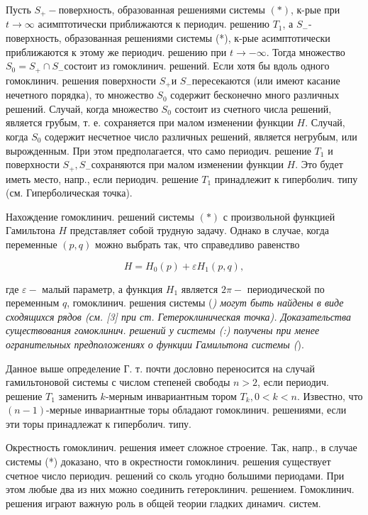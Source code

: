 \documentclass[10pt]{article}
\begin{document}
Пусть $S_{+}-$поверхность, образованная решениями системы $(*)$, к-рые при $t \rightarrow \infty$ асимптотически приближаются к периодич. решению $T_{1}$, а $S_{-}$- поверхность, образованная решениями системы (*), к-рые асимптотически приближаются к этому же периодич. решению при $t \rightarrow-\infty$. Тогда множество $S_{0}=S_{+} \cap S_{-}$состоит из гомоклинич. решений. Если хотя бы вдоль одного гомоклинич. решения поверхности $S_{+}$и $S_{-}$пересекаются (или имеют касание нечетного порядка), то множество $S_{0}$ содержит бесконечно много различных решений. Случай, когда множество $S_{0}$ состоит из счетного числа решений, является грубым, т. е. сохраняется при малом изменении функции $H$. Случай, когда $S_{0}$ содержит несчетное число различных решений, является негрубым, или вырожденным. При этом предполагается, что само периодич. решение $T_{1}$ и поверхности $S_{+}, S_{-}$сохраняются при малом изменении функции $H$. Это будет иметь место, напр., если периодич. решение $T_{1}$ принадлежит к гиперболич. типу (см. Гиперболическая точка).



Нахождение гомоклинич. решений системы $(*)$ с произвольной функцией Гамильтона $H$ представляет собой трудную задачу. Однако в случае, когда переменные $(p, q)$ можно выбрать так, что справедливо равенство



\[

H=H_{0}(p)+\varepsilon H_{1}(p, q),

\]



где $\varepsilon-$ малый параметр, а функция $H_{1}$ является $2 \pi-$ периодической по переменным $q$, гомоклинич. решения системы (\textit{) могут быть найдены в виде сходящихся рядов (см. [3] при ст. Гетероклиническая точка). Доказательства существования гомоклинич. решений у системы (:) получены при менее огранительных предположениях о функции Гамильтона системы (}).



Данное выше определение Г. т. почти дословно переносится на случай гамильтоновой системы с числом степеней свободы $n>2$, если периодич. решение $T_{1}$ заменить $k$-мерным инвариантным тором $T_{k}, 0<k<n$. Известно, что $(n-1)$-мерные инвариантные торы обладают гомоклинич. решениями, если эти торы принадлежат к гиперболич. типу.



Окрестность гомоклинич. решения имеет сложное строение. Так, напр., в случае системы (*) доказано, что в окрестности гомоклинич. решения существует счетное число периодич. решений со сколь угодно большими периодами. При этом любые два из них можно соединить гетероклинич. решением. Гомоклинич. решения играют важную роль в общей теории гладких динамич. систем.
\end{document}
